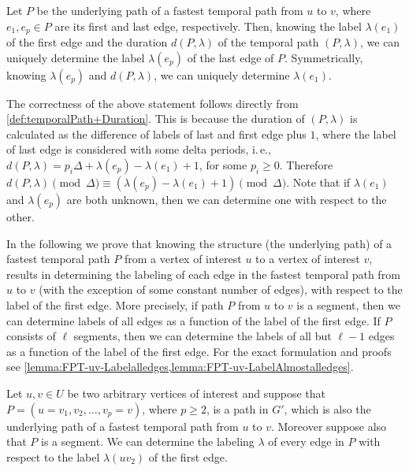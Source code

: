 \documentclass[a4paper,UKenglish,cleveref, autoref, thm-restate]{lipics-v2021}
\newcommand{\ie}{i.\,e.,\ }
\begin{document}
\begin{observation}\label{obs:FirstLabelAndDuration}
    Let $P$ be the underlying path of a fastest temporal path from $u$ to $v$, where $e_1, e_p \in P$ are its first and last edge, respectively.
    Then, knowing the label $\lambda (e_1)$ of the first edge and the duration $d(P,\lambda)$ of the temporal path $(P,\lambda)$, we can uniquely determine the label $\lambda (e_p)$ of the last edge of $P$.
    Symmetrically, knowing $\lambda(e_p)$ and $d(P,\lambda)$, we can uniquely determine $\lambda(e_1)$.
\end{observation}
The correctness of the above statement follows directly from \cref{def:temporalPath+Duration}. This is because the duration of $(P,\lambda)$ is calculated as the difference of labels of last and first edge plus $1$,
where the label of last edge is considered with some delta periods,
\ie $d(P,\lambda) = p_i \Delta + \lambda(e_p) - \lambda (e_1) + 1$, for some $p_i \geq 0$.
Therefore $d(P,\lambda) \pmod \Delta \equiv  (\lambda(e_p) - \lambda (e_1) + 1) \pmod \Delta$.
Note that if $\lambda(e_1)$ and $\lambda(e_p)$ are both unknown, then we can determine one with respect to the other.

In the following we prove that knowing the structure (the underlying path) of a fastest temporal path $P$ from a vertex of interest $u$ to a vertex of interest $v$,
results in determining the labeling of each edge in the fastest temporal path from $u$ to $v$ 
(with the exception of some constant number of edges), with respect to the label of the first edge.
More precisely, if path $P$ from $u$ to $v$ is a segment, then we can determine labels of all edges as a function of the label of the first edge.
If $P$ consists of $\ell$ segments, then we can determine the labels of all but $\ell -1$ edges as a function of the label of the first edge.
For the exact formulation and proofs see \cref{lemma:FPT-uv-Labelalledges,lemma:FPT-uv-LabelAlmostalledges}.

\begin{lemma}\label{lemma:FPT-uv-Labelalledges}
    Let $u, v \in U$ be two arbitrary vertices of interest and suppose that $P = (u=v_1,v_2, \dots, v_p = v)$, where $p \geq 2$, 
    is a path in $G'$, which is also the underlying path of a fastest temporal path from $u$ to $v$.
    Moreover suppose also that $P$ is a segment.
    We can determine the labeling $\lambda$ of every edge in $P$ with respect to the label $\lambda(uv_2)$ of the first edge.
\end{lemma}
\end{document}
